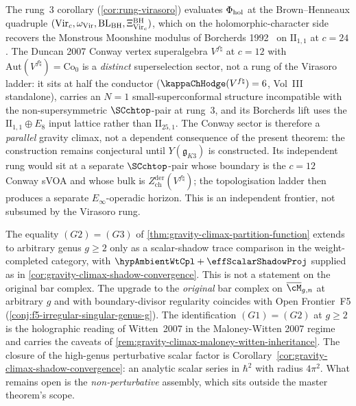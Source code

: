 \begin{remark}
The rung~$3$ corollary
(\cref{cor:rung-virasoro}) evaluates $\Phi_{\mathrm{hol}}$ at the Brown--Henneaux
quadruple \((\mathrm{Vir}_c,\omega_{\mathrm{Vir}},\mathrm{BL}_{\mathrm{BH}},
\Xi_{\mathrm{Vir}_c}^{\mathrm{BH}})\), which
on the holomorphic-character side recovers the Monstrous Moonshine
modulus of Borcherds 1992~\cite{Borcherds1992} on
$\mathrm{II}_{1, 1}$ at $c = 24$. The Duncan 2007 Conway vertex
superalgebra $V^{f\natural}$ at $c = 12$ with
$\mathrm{Aut}(V^{f\natural}) = \mathrm{Co}_{0}$ is a
\emph{distinct} superselection sector, not a rung of the Virasoro
ladder: it sits at half the conductor ($\kappaChHodge(V^{f\natural}) = 6$,
Vol~III standalone),
carries an $N = 1$ small-superconformal structure incompatible with
the non-supersymmetric $\SCchtop$-pair at rung~$3$, and its Borcherds
lift uses the $\mathrm{II}_{1, 1} \oplus E_{8}$ input lattice rather
than $\mathrm{II}_{25, 1}$. The Conway sector is therefore a
\emph{parallel} gravity climax, not a dependent consequence of the
present theorem: the construction remains conjectural until
$Y(\mathfrak{g}_{K3})$ is constructed. Its independent
rung would sit at a separate $\SCchtop$-pair whose boundary is the
$c = 12$ Conway sVOA and whose bulk is
$Z^{\mathrm{der}}_{\mathrm{ch}}(V^{f\natural})$; the topologisation
ladder then produces a separate $E_{\infty}$-operadic horizon. This
is an independent frontier, not
subsumed by the Virasoro rung.
\end{remark}

\begin{remark}
The equality $(G2) = (G3)$ of
\cref{thm:gravity-climax-partition-function} extends to arbitrary
genus $g \ge 2$ only as a scalar-shadow trace comparison in the
weight-completed category, with
\(\hypAmbientWtCpl+\effScalarShadowProj\) supplied as in
\cref{cor:gravity-climax-shadow-convergence}.  This is not a statement
on the original bar complex.  The upgrade to the \emph{original} bar
complex on
$\overline{\cM}_{g, n}$ at arbitrary $g$ and with boundary-divisor
regularity coincides with Open Frontier~F5
(\cref{conj:f5-irregular-singular-genus-g}). The identification
$(G1) = (G2)$ at $g \ge 2$ is the holographic reading of
Witten~2007 in the Maloney-Witten 2007 regime and carries the
caveats of
\cref{rem:gravity-climax-maloney-witten-inheritance}. The closure of
the high-genus perturbative scalar factor is
Corollary~\ref{cor:gravity-climax-shadow-convergence}: an analytic
scalar series in $\hbar^2$ with radius $4\pi^2$. What remains open is the
\emph{non-perturbative} assembly, which sits outside the master
theorem's scope.
\end{remark}

